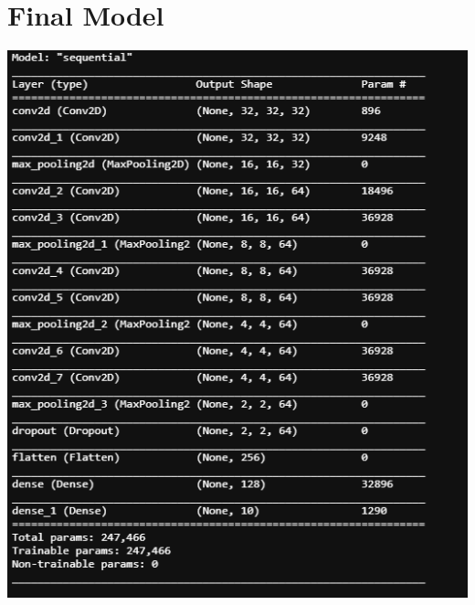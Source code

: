 \documentclass[]{article}
\begin{document}
\section{Final Model}
\includegraphics{final_model}
\end{document}
